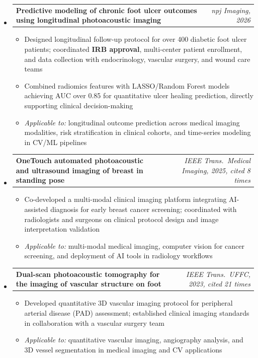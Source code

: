 \documentclass[letterpaper,10pt]{article}
\makeatletter
\newcommand{\projheading}[2]{
  \vspace{1pt}\item
  \begin{tabular*}{0.97\textwidth}[t]{l@{\extracolsep{\fill}}r}
    \textbf{#1} & \textit{\small#2} \\
  \end{tabular*}\vspace{2pt}
}
\newcommand{\projItemListStart}{\begin{itemize}[leftmargin=0.2in, topsep=3pt]}
\newcommand{\projItemListEnd}{\end{itemize}\vspace{2pt}}
\makeatother
\begin{document}
\begin{itemize}[leftmargin=0in, label={}]

  \projheading{Predictive modeling of chronic foot ulcer outcomes using longitudinal photoacoustic imaging}{npj Imaging, 2026}
  \projItemListStart
    \item Designed longitudinal follow-up protocol for over 400 diabetic foot ulcer patients; coordinated \textbf{IRB approval}, multi-center patient enrollment, and data collection with endocrinology, vascular surgery, and wound care teams
    \item Combined radiomics features with LASSO/Random Forest models achieving AUC over 0.85 for quantitative ulcer healing prediction, directly supporting clinical decision-making
    \item \textit{Applicable to:} longitudinal outcome prediction across medical imaging modalities, risk stratification in clinical cohorts, and time-series modeling in CV/ML pipelines
  \projItemListEnd

  \projheading{OneTouch automated photoacoustic and ultrasound imaging of breast in standing pose}{IEEE Trans.\ Medical Imaging, 2025, cited 8 times}
  \projItemListStart
    \item Co-developed a multi-modal clinical imaging platform integrating AI-assisted diagnosis for early breast cancer screening; coordinated with radiologists and surgeons on clinical protocol design and image interpretation validation
    \item \textit{Applicable to:} multi-modal medical imaging, computer vision for cancer screening, and deployment of AI tools in radiology workflows
  \projItemListEnd

  \projheading{Dual-scan photoacoustic tomography for the imaging of vascular structure on foot}{IEEE Trans.\ UFFC, 2023, cited 21 times}
  \projItemListStart
    \item Developed quantitative 3D vascular imaging protocol for peripheral arterial disease (PAD) assessment; established clinical imaging standards in collaboration with a vascular surgery team
    \item \textit{Applicable to:} quantitative vascular imaging, angiography analysis, and 3D vessel segmentation in medical imaging and CV applications
  \projItemListEnd

\end{itemize}

\vspace{-2pt}
\end{document}
